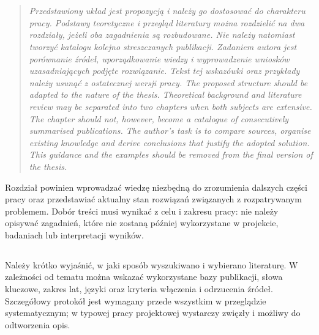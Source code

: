 \chapter{}


\begin{quote}
\itshape
\ploren
  {Przedstawiony układ jest propozycją i należy go dostosować do charakteru pracy. Podstawy teoretyczne i przegląd literatury można rozdzielić na dwa rozdziały, jeżeli oba zagadnienia są rozbudowane. Nie należy natomiast tworzyć katalogu kolejno streszczanych publikacji. Zadaniem autora jest porównanie źródeł, uporządkowanie wiedzy i wyprowadzenie wniosków uzasadniających podjęte rozwiązanie. Tekst tej wskazówki oraz przykłady należy usunąć z ostatecznej wersji pracy.}
  {The proposed structure should be adapted to the nature of the thesis. Theoretical background and literature review may be separated into two chapters when both subjects are extensive. The chapter should not, however, become a catalogue of consecutively summarised publications. The author's task is to compare sources, organise existing knowledge and derive conclusions that justify the adopted solution. This guidance and the examples should be removed from the final version of the thesis.}
\end{quote}

Rozdział powinien wprowadzać wiedzę niezbędną do zrozumienia dalszych części pracy oraz przedstawiać aktualny stan rozwiązań związanych z rozpatrywanym problemem. Dobór treści musi wynikać z celu i zakresu pracy: nie należy opisywać zagadnień, które nie zostaną później wykorzystane w projekcie, badaniach lub interpretacji wyników.

\section{}

Należy krótko wyjaśnić, w jaki sposób wyszukiwano i wybierano literaturę. W zależności od tematu można wskazać wykorzystane bazy publikacji, słowa kluczowe, zakres lat, języki oraz kryteria włączenia i odrzucenia źródeł. Szczegółowy protokół jest wymagany przede wszystkim w przeglądzie systematycznym; w typowej pracy projektowej wystarczy zwięzły i możliwy do odtworzenia opis.

